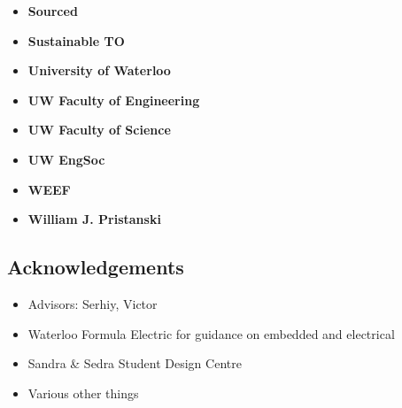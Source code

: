 \documentclass[main.tex]{subfiles}
\begin{document}
\begin{flushleft}
\begin{multicols}{3}
\begin{itemize}[label={},noitemsep]
    \item \textbf{Sourced}
    \end{itemize}
    \columnbreak
    \begin{itemize}[label={},noitemsep]
    \item \textbf{Sustainable TO}
    \end{itemize}
    \columnbreak
    \begin{itemize}[label={},noitemsep]
    \item \textbf{University of Waterloo}
    \end{itemize}
    \columnbreak
\end{multicols}

\begin{multicols}{3}
\begin{itemize}[label={},noitemsep]
    \item \textbf{UW Faculty of Engineering}
    \end{itemize}
    \columnbreak
    \begin{itemize}[label={},noitemsep]
    \item \textbf{UW Faculty of Science}
    \end{itemize}
    \columnbreak
    \begin{itemize}[label={},noitemsep]
    \item \textbf{UW EngSoc}
    \end{itemize}
    \columnbreak
\end{multicols}

\begin{multicols}{2}
\begin{itemize}[label={},noitemsep]
    \item \textbf{WEEF}
    \end{itemize}
    \columnbreak
    \begin{itemize}[label={},noitemsep]
    \item \textbf{William J. Pristanski}
    \end{itemize}
    \columnbreak
\end{multicols}

\subsection{Acknowledgements}

\begin{itemize}
    \item Advisors: Serhiy, Victor
    \item Waterloo Formula Electric for guidance on embedded and electrical
    \item Sandra \& Sedra Student Design Centre
    \item Various other things
\end{itemize}

\end{flushleft}
\end{document}
